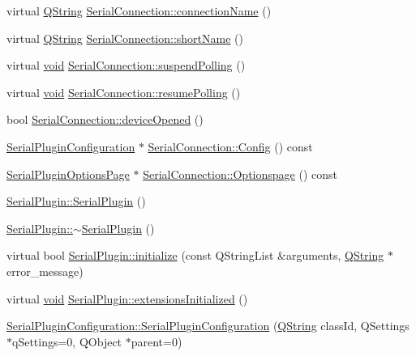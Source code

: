 \begin{DoxyCompactItemize}
virtual \hyperlink{group___u_a_v_objects_plugin_gab9d252f49c333c94a72f97ce3105a32d}{Q\-String} \hyperlink{group___serial_plugin_ga4b91aa098a25069f0590a25687bdf25b}{Serial\-Connection\-::connection\-Name} ()
\item 
virtual \hyperlink{group___u_a_v_objects_plugin_gab9d252f49c333c94a72f97ce3105a32d}{Q\-String} \hyperlink{group___serial_plugin_ga6783c4f6c9faa91aeb0b91fef726a2d4}{Serial\-Connection\-::short\-Name} ()
\item 
virtual \hyperlink{group___u_a_v_objects_plugin_ga444cf2ff3f0ecbe028adce838d373f5c}{void} \hyperlink{group___serial_plugin_ga9616a4134ceba88c6ae5820e29a783c4}{Serial\-Connection\-::suspend\-Polling} ()
\item 
virtual \hyperlink{group___u_a_v_objects_plugin_ga444cf2ff3f0ecbe028adce838d373f5c}{void} \hyperlink{group___serial_plugin_gac4a001507836025006728ab1771116f0}{Serial\-Connection\-::resume\-Polling} ()
\item 
bool \hyperlink{group___serial_plugin_gaa9616a7f264a903a0a5b13ae05d40375}{Serial\-Connection\-::device\-Opened} ()
\item 
\hyperlink{class_serial_plugin_configuration}{Serial\-Plugin\-Configuration} $\ast$ \hyperlink{group___serial_plugin_gad054f24566a90754595ad08e00756bfc}{Serial\-Connection\-::\-Config} () const 
\item 
\hyperlink{class_serial_plugin_options_page}{Serial\-Plugin\-Options\-Page} $\ast$ \hyperlink{group___serial_plugin_gaf86b9d4296b2b9e6429dd643fd113861}{Serial\-Connection\-::\-Optionspage} () const 
\item 
\hyperlink{group___serial_plugin_ga61918aa34cb91654613f5ae3e2992cb5}{Serial\-Plugin\-::\-Serial\-Plugin} ()
\item 
\hyperlink{group___serial_plugin_gaed0afbd615d41b58d07b4916f4c9e277}{Serial\-Plugin\-::$\sim$\-Serial\-Plugin} ()
\item 
virtual bool \hyperlink{group___serial_plugin_ga06e1847534162b254c0790b2221e2836}{Serial\-Plugin\-::initialize} (const Q\-String\-List \&arguments, \hyperlink{group___u_a_v_objects_plugin_gab9d252f49c333c94a72f97ce3105a32d}{Q\-String} $\ast$error\-\_\-message)
\item 
virtual \hyperlink{group___u_a_v_objects_plugin_ga444cf2ff3f0ecbe028adce838d373f5c}{void} \hyperlink{group___serial_plugin_ga513ef44cd1747f6859255f102fc9f845}{Serial\-Plugin\-::extensions\-Initialized} ()
\item 
\hyperlink{group___serial_plugin_ga15a723a8f3215c718070ef32ea6fff2e}{Serial\-Plugin\-Configuration\-::\-Serial\-Plugin\-Configuration} (\hyperlink{group___u_a_v_objects_plugin_gab9d252f49c333c94a72f97ce3105a32d}{Q\-String} class\-Id, Q\-Settings $\ast$q\-Settings=0, Q\-Object $\ast$parent=0)

\end{DoxyCompactItemize}
